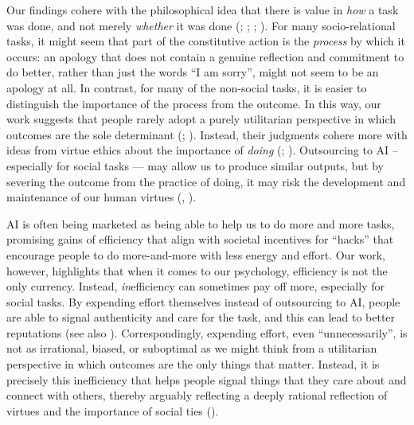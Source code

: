 \documentclass[
  man,
  floatsintext,
  longtable,
  nolmodern,
  notxfonts,
  notimes,
  colorlinks=true,linkcolor=blue,citecolor=blue,urlcolor=blue]{apa7}
\begin{document}
Our findings cohere with the philosophical idea that there is value in
\emph{how} a task was done, and not merely \emph{whether} it was done
(;
;
;
). For many socio-relational tasks,
it might seem that part of the constitutive action is the \emph{process}
by which it occurs: an apology that does not contain a genuine
reflection and commitment to do better, rather than just the words ``I
am sorry'', might not seem to be an apology at all. In contrast, for
many of the non-social tasks, it is easier to distinguish the importance
of the process from the outcome. In this way, our work suggests that
people rarely adopt a purely utilitarian perspective in which outcomes
are the sole determinant (; ). Instead, their
judgments cohere more with ideas from virtue ethics about the importance
of \emph{doing} (; ). Outsourcing to AI --
especially for social tasks --- may allow us to produce similar outputs,
but by severing the outcome from the practice of doing, it may risk the
development and maintenance of our human virtues
(,
).

AI is often being marketed as being able to help us to do more and more
tasks, promising gains of efficiency that align with societal incentives
for ``hacks'' that encourage people to do more-and-more with less energy
and effort. Our work, however, highlights that when it comes to our
psychology, efficiency is not the only currency. Instead,
\emph{in}efficiency can sometimes pay off more, especially for social
tasks. By expending effort themselves instead of outsourcing to AI,
people are able to signal authenticity and care for the task, and this
can lead to better reputations (see also
). Correspondingly,
expending effort, even ``unnecessarily'', is not as irrational, biased,
or suboptimal as we might think from a utilitarian perspective in which
outcomes are the only things that matter. Instead, it is precisely this
inefficiency that helps people signal things that they care about and
connect with others, thereby arguably reflecting a deeply rational
reflection of virtues and the importance of social ties
().
\end{document}
